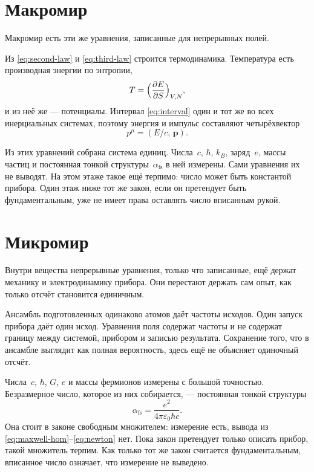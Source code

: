 \section{Макромир}
\label{sec:macro-known}

Макромир есть эти же уравнения, записанные для непрерывных полей.

Из \eqref{eq:second-law} и \eqref{eq:third-law} строится термодинамика.
Температура есть производная энергии по энтропии,
\begin{equation}
  T = \Bigl(\frac{\partial E}{\partial S}\Bigr)_{V,N},
  \label{eq:temperature}
\end{equation}
и из неё же --- потенциалы.
Интервал \eqref{eq:interval} один и тот же во всех инерциальных системах,
поэтому энергия и импульс составляют четырёхвектор
\begin{equation}
  p^{\mu} = (E/c,\,\mathbf{p}).
  \label{eq:four-momentum}
\end{equation}

Из этих уравнений собрана система единиц.
Числа~$c$, $\hbar$, $k_B$, заряд~$e$, массы частиц и постоянная тонкой структуры~$\alpha_{\mathrm{fs}}$ в ней измерены.
Сами уравнения их не выводят.
На этом этаже такое ещё терпимо: число может быть константой прибора.
Один этаж ниже тот же закон, если он претендует быть фундаментальным, уже не имеет права оставлять число вписанным рукой.

\section{Микромир}
\label{sec:macro-open}
\label{sec:microworld}

Внутри вещества непрерывные уравнения, только что записанные, ещё держат механику и электродинамику прибора.
Они перестают держать сам опыт, как только отсчёт становится единичным.

Ансамбль подготовленных одинаково атомов даёт частоты исходов.
Один запуск прибора даёт один исход.
Уравнения поля содержат частоты и не содержат границу между системой, прибором и записью результата.
Сохранение того, что в ансамбле выглядит как полная вероятность, здесь ещё не объясняет одиночный отсчёт.

Числа~$c$, $\hbar$, $G$, $e$ и массы фермионов измерены с большой точностью.
Безразмерное число, которое из них собирается, --- постоянная тонкой структуры
\begin{equation}
  \alpha_{\mathrm{fs}} = \frac{e^2}{4\pi\varepsilon_0\hbar c}.
  \label{eq:alpha-fs}
\end{equation}
Она стоит в законе свободным множителем:
измерение есть, вывода из \eqref{eq:maxwell-hom}--\eqref{eq:newton} нет.
Пока закон претендует только описать прибор, такой множитель терпим.
Как только тот же закон считается фундаментальным, вписанное число означает, что измерение не выведено.


